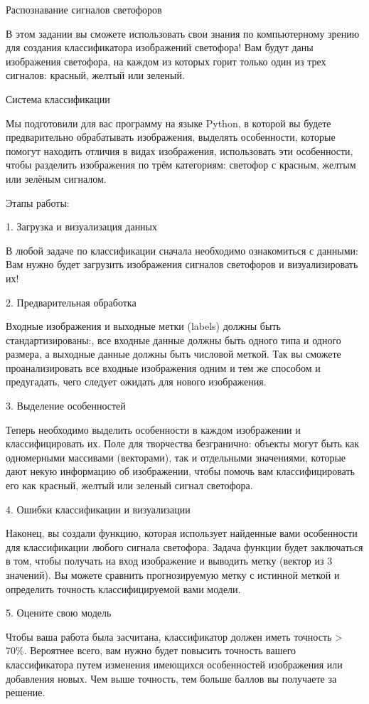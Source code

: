 \assignementTitle{}{}{}

Распознавание сигналов светофоров

В этом задании вы сможете использовать свои знания по компьютерному зрению для создания классификатора изображений светофора! Вам будут даны изображения светофора, на каждом из которых горит только один из трех сигналов: красный, желтый или зеленый.

Система классификации

Мы подготовили для вас программу на языке Python, в которой вы будете предварительно обрабатывать изображения, выделять особенности, которые помогут находить отличия в видах изображения, использовать эти особенности, чтобы разделить изображения по трём категориям: светофор с красным, желтым или зелёным сигналом.

Этапы работы:

1. Загрузка и визуализация данных

В любой задаче по классификации сначала необходимо ознакомиться с данными: Вам нужно будет загрузить изображения сигналов светофоров и визуализировать их!

2. Предварительная обработка

Входные изображения и выходные метки (labels) должны быть стандартизированы:, все входные данные должны быть одного типа и одного размера, а выходные данные должны быть числовой меткой. Так вы сможете проанализировать все входные изображения одним и тем же способом и предугадать, чего следует ожидать для нового изображения.

3. Выделение особенностей

Теперь необходимо выделить особенности в каждом изображении и классифицировать их. Поле для творчества безгранично: объекты могут быть как одномерными массивами (векторами), так и отдельными значениями, которые дают некую информацию об изображении, чтобы помочь вам классифицировать его как красный, желтый или зеленый сигнал светофора. 


4. Ошибки классификации и визуализации

Наконец, вы создали функцию, которая использует найденные вами особенности для классификации любого сигнала светофора. Задача функции будет заключаться в том, чтобы получать на вход изображение и выводить метку (вектор из 3 значений). Вы можете сравнить прогнозируемую метку с истинной меткой и определить точность классифицируемой вами модели.

5. Оцените свою модель

Чтобы ваша работа была засчитана, классификатор должен иметь точность > 70\%. Вероятнее всего, вам нужно будет повысить точность вашего классификатора путем изменения имеющихся особенностей изображения или добавления новых. Чем выше точность, тем больше баллов вы получаете за решение.